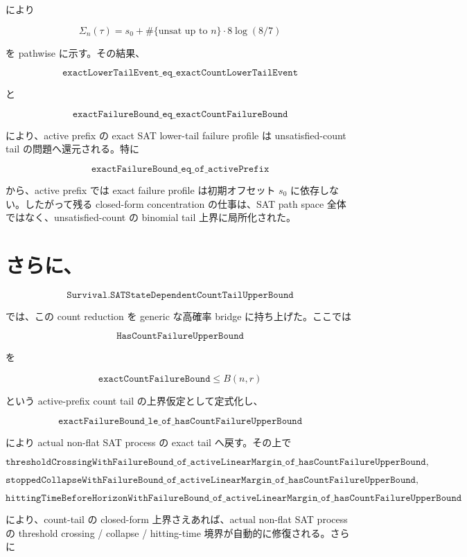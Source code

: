 \documentclass[12pt,a4paper]{article}
\begin{document}
により

\[
\Sigma_{n}(\tau)=s_0+\#\{\text{unsat up to }n\}\cdot 8\log(8/7)
\]

を pathwise に示す。その結果、

\[
\texttt{exactLowerTailEvent\_eq\_exactCountLowerTailEvent}
\]

と

\[
\texttt{exactFailureBound\_eq\_exactCountFailureBound}
\]

により、active prefix の exact SAT lower-tail failure profile は unsatisfied-count tail の問題へ還元される。特に

\[
\texttt{exactFailureBound\_eq\_of\_activePrefix}
\]

から、active prefix では exact failure profile は初期オフセット \(s_0\) に依存しない。したがって残る closed-form concentration の仕事は、SAT path space 全体ではなく、unsatisfied-count の binomial tail 上界に局所化された。

\section{さらに、}\label{ux3055ux3089ux306b-22}

\[
\texttt{Survival.SATStateDependentCountTailUpperBound}
\]

では、この count reduction を generic な高確率 bridge に持ち上げた。ここでは

\[
\texttt{HasCountFailureUpperBound}
\]

を

\[
\texttt{exactCountFailureBound} \le B(n,r)
\]

という active-prefix count tail の上界仮定として定式化し、

\[
\texttt{exactFailureBound\_le\_of\_hasCountFailureUpperBound}
\]

により actual non-flat SAT process の exact tail へ戻す。その上で

\[
\texttt{thresholdCrossingWithFailureBound\_of\_activeLinearMargin\_of\_hasCountFailureUpperBound},
\]

\[
\texttt{stoppedCollapseWithFailureBound\_of\_activeLinearMargin\_of\_hasCountFailureUpperBound},
\]

\[
\texttt{hittingTimeBeforeHorizonWithFailureBound\_of\_activeLinearMargin\_of\_hasCountFailureUpperBound}
\]

により、count-tail の closed-form 上界さえあれば、actual non-flat SAT process の threshold crossing / collapse / hitting-time 境界が自動的に修復される。さらに
\end{document}
